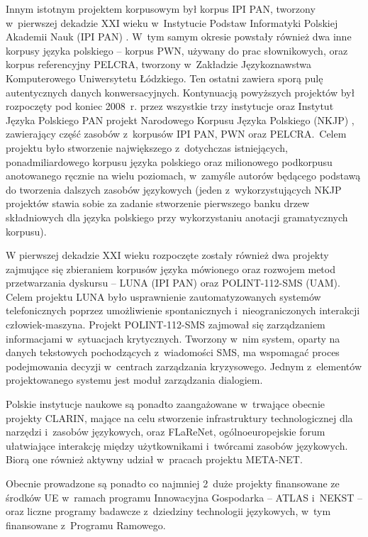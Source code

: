 \begin{multicols}{2}
Innym istotnym projektem korpusowym był korpus IPI PAN, tworzony
w~pierwszej dekadzie XXI wieku w~Instytucie Podstaw Informatyki
Polskiej Akademii Nauk (IPI PAN) \cite{korpus1}. W~tym samym okresie
powstały również dwa inne korpusy języka polskiego – korpus PWN,
używany do prac słownikowych, oraz korpus referencyjny PELCRA,
tworzony w~Zakładzie Językoznawstwa Komputerowego Uniwersytetu
Łódzkiego. Ten ostatni zawiera sporą pulę autentycznych danych
konwersacyjnych. Kontynuacją powyższych projektów był rozpoczęty
pod koniec 2008~r. przez wszystkie trzy instytucje oraz Instytut
Języka Polskiego PAN projekt Narodowego Korpusu Języka Polskiego
(NKJP) \cite{nkjp1}, zawierający część zasobów z~korpusów IPI
PAN, PWN oraz PELCRA.~Celem projektu było stworzenie największego
z~dotychczas istniejących, ponadmiliardowego korpusu języka
polskiego oraz milionowego podkorpusu anotowanego ręcznie na wielu
poziomach, w~zamyśle autorów będącego podstawą do tworzenia
dalszych zasobów językowych (jeden z~wykorzystujących NKJP
projektów stawia sobie za zadanie stworzenie pierwszego banku drzew
składniowych dla języka polskiego przy wykorzystaniu anotacji
gramatycznych korpusu). 

W pierwszej dekadzie XXI wieku rozpoczęte zostały również dwa
projekty zajmujące się zbieraniem korpusów języka mówionego oraz
rozwojem metod przetwarzania dyskursu – LUNA (IPI PAN) oraz
POLINT-112-SMS (UAM). Celem projektu LUNA było usprawnienie
zautomatyzowanych systemów telefonicznych poprzez umożliwienie
spontanicznych i~nieograniczonych interakcji człowiek-maszyna.
Projekt POLINT-112-SMS zajmował się zarządzaniem informacjami
w~sytuacjach krytycznych. Tworzony w~nim system, oparty na danych
tekstowych pochodzących z~wiadomości SMS, ma wspomagać proces
podejmowania decyzji w~centrach zarządzania kryzysowego. Jednym
z~elementów projektowanego systemu jest moduł zarządzania
dialogiem. 

Polskie instytucje naukowe są ponadto zaangażowane w~trwające
obecnie projekty CLARIN, mające na celu stworzenie infrastruktury
technologicznej dla narzędzi i~zasobów językowych, oraz FLaReNet,
ogólnoeuropejskie forum ułatwiające interakcję między
użytkownikami i~twórcami zasobów językowych. Biorą one również
aktywny udział w~pracach projektu META-NET. 

Obecnie prowadzone są ponadto co najmniej 2~duże projekty
finansowane ze środków UE w~ramach programu Innowacyjna Gospodarka
– ATLAS i~NEKST – oraz liczne programy badawcze z~dziedziny
technologii językowych, w~tym finansowane z~Programu Ramowego. 


\end{multicols}
